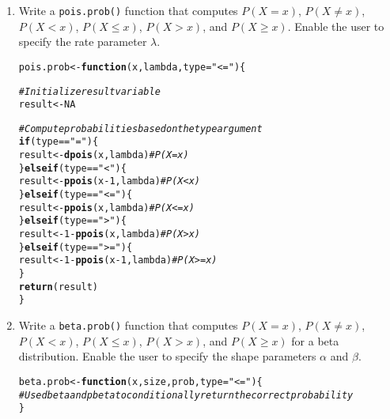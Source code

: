 \documentclass{article}\usepackage[]{graphicx}\usepackage[]{xcolor}
\makeatletter
\newcommand{\hlnum}[1]{\textcolor[rgb]{0.686,0.059,0.569}{#1}}%
\newcommand{\hlsng}[1]{\textcolor[rgb]{0.192,0.494,0.8}{#1}}%
\newcommand{\hlcom}[1]{\textcolor[rgb]{0.678,0.584,0.686}{\textit{#1}}}%
\newcommand{\hlopt}[1]{\textcolor[rgb]{0,0,0}{#1}}%
\newcommand{\hldef}[1]{\textcolor[rgb]{0.345,0.345,0.345}{#1}}%
\newcommand{\hlkwa}[1]{\textcolor[rgb]{0.161,0.373,0.58}{\textbf{#1}}}%
\newcommand{\hlkwb}[1]{\textcolor[rgb]{0.69,0.353,0.396}{#1}}%
\newcommand{\hlkwc}[1]{\textcolor[rgb]{0.333,0.667,0.333}{#1}}%
\newcommand{\hlkwd}[1]{\textcolor[rgb]{0.737,0.353,0.396}{\textbf{#1}}}%
\newenvironment{kframe}{%
 \def\at@end@of@kframe{}%
 \ifinner\ifhmode%
  \def\at@end@of@kframe{\end{minipage}}%
  \begin{minipage}{\columnwidth}%
 \fi\fi%
 \def\FrameCommand##1{\hskip\@totalleftmargin \hskip-\fboxsep
 \colorbox{shadecolor}{##1}\hskip-\fboxsep
     \hskip-\linewidth \hskip-\@totalleftmargin \hskip\columnwidth}%
 \MakeFramed {\advance\hsize-\width
   \@totalleftmargin\z@ \linewidth\hsize
   \@setminipage}}%
 {\par\unskip\endMakeFramed%
 \at@end@of@kframe}
\newenvironment{knitrout}{}{} %
\makeatother
\begin{document}
  \begin{enumerate}
    \item Write a \texttt{pois.prob()} function that computes $P(X=x)$, 
    $P(X \neq x)$, $P(X<x)$, $P(X \leq x)$, $P(X > x)$, and $P(X \geq x).$ Enable the user to specify the rate parameter $\lambda$.
\begin{knitrout}\scriptsize
{}\color{fgcolor}\begin{kframe}
\begin{alltt}
\hldef{pois.prob} \hlkwb{<-} \hlkwa{function}\hldef{(}\hlkwc{x}\hldef{,} \hlkwc{lambda}\hldef{,} \hlkwc{type}\hldef{=}\hlsng{"<="}\hldef{) \{}

  \hlcom{# Initialize result variable}
  \hldef{result} \hlkwb{<-} \hlnum{NA}

  \hlcom{# Compute probabilities based on the type argument}
  \hlkwa{if} \hldef{(type} \hlopt{==} \hlsng{"="}\hldef{) \{}
    \hldef{result} \hlkwb{<-} \hlkwd{dpois}\hldef{(x, lambda)}  \hlcom{# P(X = x)}
  \hldef{\}} \hlkwa{else if} \hldef{(type} \hlopt{==} \hlsng{"<"}\hldef{) \{}
    \hldef{result} \hlkwb{<-} \hlkwd{ppois}\hldef{(x} \hlopt{-} \hlnum{1}\hldef{, lambda)}  \hlcom{# P(X < x)}
  \hldef{\}} \hlkwa{else if} \hldef{(type} \hlopt{==} \hlsng{"<="}\hldef{) \{}
    \hldef{result} \hlkwb{<-} \hlkwd{ppois}\hldef{(x, lambda)}  \hlcom{# P(X <= x)}
  \hldef{\}} \hlkwa{else if} \hldef{(type} \hlopt{==} \hlsng{">"}\hldef{) \{}
    \hldef{result} \hlkwb{<-} \hlnum{1} \hlopt{-} \hlkwd{ppois}\hldef{(x, lambda)}  \hlcom{# P(X > x)}
  \hldef{\}} \hlkwa{else if} \hldef{(type} \hlopt{==} \hlsng{">="}\hldef{) \{}
    \hldef{result} \hlkwb{<-} \hlnum{1} \hlopt{-} \hlkwd{ppois}\hldef{(x} \hlopt{-} \hlnum{1}\hldef{, lambda)}  \hlcom{# P(X >= x)}
  \hldef{\}}
  \hlkwd{return}\hldef{(result)}
\hldef{\}}
\end{alltt}
\end{kframe}
\end{knitrout}
    \item Write a \texttt{beta.prob()} function that computes $P(X=x)$, 
    $P(X \neq x)$, $P(X<x)$, $P(X \leq x)$, $P(X > x)$, and $P(X \geq x)$
    for a beta distribution. Enable the user to specify the shape parameters
    $\alpha$ and $\beta$.
\begin{knitrout}\scriptsize
{}\color{fgcolor}\begin{kframe}
\begin{alltt}
\hldef{beta.prob} \hlkwb{<-} \hlkwa{function}\hldef{(}\hlkwc{x}\hldef{,} \hlkwc{size}\hldef{,} \hlkwc{prob}\hldef{,} \hlkwc{type}\hldef{=}\hlsng{"<="}\hldef{)\{}
  \hlcom{# Use dbeta and pbeta to conditionally return the correct probability}
\hldef{\}}
\end{alltt}
\end{kframe}
\end{knitrout}
\end{enumerate}

\end{document}
